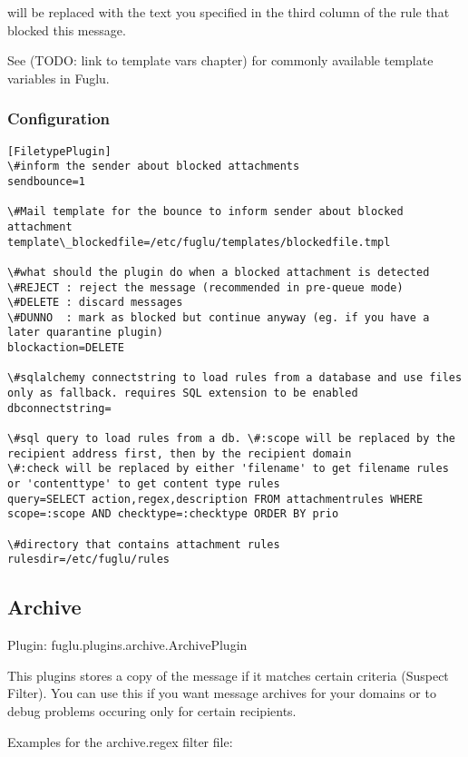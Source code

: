 \documentclass[letterpaper,10pt,english]{sphinxmanual}
\begin{document}
 will be replaced with the text you specified in the third column of the rule that blocked this message.

See (TODO: link to template vars chapter) for commonly available template variables in Fuglu.


\subsubsection{Configuration}
\label{plugins-index:id2}
\begin{Verbatim}[commandchars=\\\{\}]
[FiletypePlugin]
\#inform the sender about blocked attachments
sendbounce=1

\#Mail template for the bounce to inform sender about blocked attachment
template\_blockedfile=/etc/fuglu/templates/blockedfile.tmpl

\#what should the plugin do when a blocked attachment is detected
\#REJECT : reject the message (recommended in pre-queue mode)
\#DELETE : discard messages
\#DUNNO  : mark as blocked but continue anyway (eg. if you have a later quarantine plugin)
blockaction=DELETE

\#sqlalchemy connectstring to load rules from a database and use files only as fallback. requires SQL extension to be enabled
dbconnectstring=

\#sql query to load rules from a db. \#:scope will be replaced by the recipient address first, then by the recipient domain
\#:check will be replaced by either 'filename' to get filename rules or 'contenttype' to get content type rules
query=SELECT action,regex,description FROM attachmentrules WHERE scope=:scope AND checktype=:checktype ORDER BY prio

\#directory that contains attachment rules
rulesdir=/etc/fuglu/rules
\end{Verbatim}


\subsection{Archive}
\label{plugins-index:archive}
Plugin: fuglu.plugins.archive.ArchivePlugin

This plugins stores a copy of the message if it matches certain criteria (Suspect Filter).
You can use this if you want message archives for your domains or to debug problems occuring only for certain recipients.

Examples for the archive.regex filter file:
\end{document}
